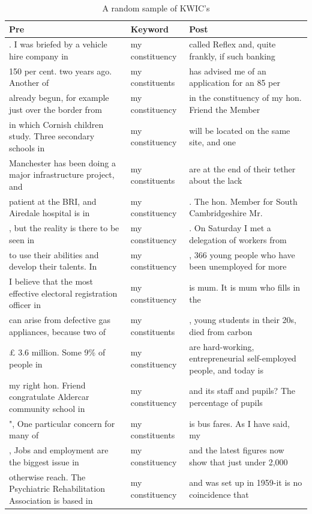 \documentclass[]{article}
\begin{document}
\begin{longtabu} to 
\caption{\label{tab:constituent-kwic}A random sample of KWIC's}\\
\toprule
Pre & Keyword & Post\\
\midrule
. I was briefed by a vehicle hire company in & my constituency & called Reflex and, quite frankly, if such banking\\
150 per cent. two years ago. Another of & my constituents & has advised me of an application for an 85 per\\
already begun, for example just over the border from & my constituency & in the constituency of my hon. Friend the Member\\
in which Cornish children study. Three secondary schools in & my constituency & will be located on the same site, and one\\
Manchester has been doing a major infrastructure project, and & my constituents & are at the end of their tether about the lack\\
\addlinespace
patient at the BRI, and Airedale hospital is in & my constituency & . The hon. Member for South Cambridgeshire Mr.\\
, but the reality is there to be seen in & my constituency & . On Saturday I met a delegation of workers from\\
to use their abilities and develop their talents. In & my constituency & , 366 young people who have been unemployed for more\\
I believe that the most effective electoral registration officer in & my constituency & is mum. It is mum who fills in the\\
can arise from defective gas appliances, because two of & my constituents & , young students in their 20s, died from carbon\\
\addlinespace
£ 3.6 million. Some 9\% of people in & my constituency & are hard-working, entrepreneurial self-employed people, and today is\\
my right hon. Friend congratulate Aldercar community school in & my constituency & and its staff and pupils? The percentage of pupils\\
",  One particular concern for many of & my constituents & is bus fares. As I have said, my\\
,  Jobs and employment are the biggest issue in & my constituency & and the latest figures now show that just under 2,000\\
otherwise reach. The Psychiatric Rehabilitation Association is based in & my constituency & and was set up in 1959-it is no coincidence that\\

\end{longtabu}
\end{document}

